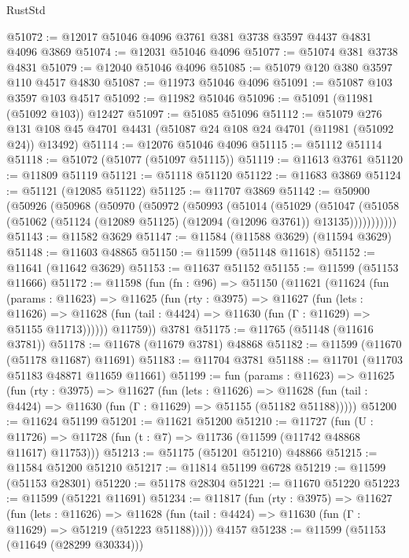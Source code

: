 \begin{lexlean}{RustStd}
\begin{coremodule}
@51072 := @12017 @51046 @4096 @3761 @381 @3738 @3597 @4437 @4831 @4096 @3869
@51074 := @12031 @51046 @4096
@51077 := @51074 @381 @3738 @4831
@51079 := @12040 @51046 @4096
@51085 := @51079 @120 @380 @3597 @110 @4517 @4830
@51087 := @11973 @51046 @4096
@51091 := @51087 @103 @3597 @103 @4517
@51092 := @11982 @51046
@51096 := @51091 (@11981 (@51092 @103)) @12427
@51097 := @51085 @51096
@51112 := @51079
    @276
    @131
    @108
    @45
    @4701
    @4431
    (@51087 @24 @108 @24 @4701 (@11981 (@51092 @24)) @13492)
@51114 := @12076 @51046 @4096
@51115 := @51112 @51114
@51118 := @51072 (@51077 (@51097 @51115))
@51119 := @11613 @3761
@51120 := @11809 @51119
@51121 := @51118 @51120
@51122 := @11683 @3869
@51124 := @51121 (@12085 @51122)
@51125 := @11707 @3869
@51142 := @50900
    (@50926
      (@50968
        (@50970
          (@50972
            (@50993
              (@51014
                (@51029
                  (@51047
                    (@51058
                      (@51062 (@51124 (@12089 @51125) (@12094 (@12096 @3761)) @13135)))))))))))
@51143 := @11582 @3629
@51147 := @11584 (@11588 @3629) (@11594 @3629)
@51148 := @11603 @48865
@51150 := @11599 (@51148 @11618)
@51152 := @11641 (@11642 @3629)
@51153 := @11637 @51152
@51155 := @11599 (@51153 @11666)
@51172 := @11598
    (fun (fn : @96) =>
    @51150
      (@11621
        (@11624
          (fun (params : @11623) =>
          @11625
            (fun (rty : @3975) =>
            @11627
              (fun (lets : @11626) =>
              @11628 (fun (tail : @4424) => @11630 (fun (Γ : @11629) => @51155 @11713))))))
        @11759))
    @3781
@51175 := @11765 (@51148 (@11616 @3781))
@51178 := @11678 (@11679 @3781) @48868
@51182 := @11599 (@11670 (@51178 @11687) @11691)
@51183 := @11704 @3781
@51188 := @11701 (@11703 @51183 @48871 @11659 @11661)
@51199 := fun (params : @11623) =>
  @11625
    (fun (rty : @3975) =>
    @11627
      (fun (lets : @11626) =>
      @11628 (fun (tail : @4424) => @11630 (fun (Γ : @11629) => @51155 (@51182 @51188)))))
@51200 := @11624 @51199
@51201 := @11621 @51200
@51210 := @11727
    (fun (U : @11726) => @11728 (fun (t : @7) => @11736 (@11599 (@11742 @48868 @11617) @11753)))
@51213 := @51175 (@51201 @51210) @48866
@51215 := @11584 @51200 @51210
@51217 := @11814 @51199 @6728
@51219 := @11599 (@51153 @28301)
@51220 := @51178 @28304
@51221 := @11670 @51220
@51223 := @11599 (@51221 @11691)
@51234 := @11817
    (fun (rty : @3975) =>
    @11627
      (fun (lets : @11626) =>
      @11628 (fun (tail : @4424) => @11630 (fun (Γ : @11629) => @51219 (@51223 @51188)))))
    @4157
@51238 := @11599 (@51153 (@11649 (@28299 @30334)))

\end{coremodule}
\end{lexlean}
